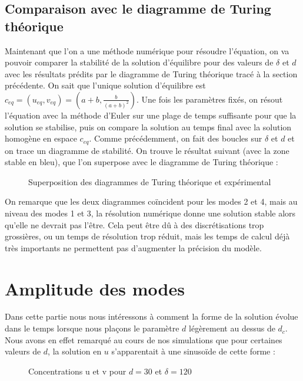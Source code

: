 \documentclass[12pt,a4paper]{article}
\begin{document}
\subsection{Comparaison avec le diagramme de Turing théorique}
Maintenant que l'on a une méthode numérique pour résoudre l'équation, on va pouvoir comparer la stabilité de la solution d'équilibre pour des valeurs de $\delta$ et $d$ avec les résultats prédits par le diagramme de Turing théorique tracé à la section précédente. On sait que l'unique solution d'équilibre est $c_{eq} = (u_{eq},v_{eq}) = (a + b, \frac{b}{(a+b)^{2}})$. Une fois les paramètres fixés, on résout l'équation avec la méthode d'Euler sur une plage de temps suffisante pour que la solution se stabilise, puis on compare la solution au temps final avec la solution homogène en espace $c_{eq}$. Comme précédemment, on fait des boucles sur $\delta$ et $d$ et on trace un diagramme de stabilité. On trouve le résultat suivant (avec la zone stable en bleu), que l'on superpose avec le diagramme de Turing théorique :
\begin{figure}[h!]
\caption{Superposition des diagrammes de Turing théorique et expérimental}
\label{fig concentration1}
\end{figure}

On remarque que les deux diagrammes coïncident pour les modes 2 et 4, mais au niveau des modes 1 et 3, la résolution numérique donne une solution stable alors qu'elle ne devrait pas l'être. Cela peut être dû à des discrétisations trop grossières, ou un temps de résolution trop réduit, mais les temps de calcul déjà très importants ne permettent pas d'augmenter la précision du modèle.


\section{Amplitude des modes}
Dans cette partie nous nous intéressons à comment la forme de la solution évolue dans le temps lorsque nous plaçons le paramètre $d$ légèrement au dessus de $d_c$. Nous avons en effet remarqué au cours de nos simulations que pour certaines valeurs de $d$, la solution en $u$ s'apparentait à une sinusoïde de cette forme :
\begin{figure}[h!]
\caption{Concentrations u et v pour $d=30$ et $\delta = 120$}
\label{fig concentration1}
\end{figure}
\end{document}
